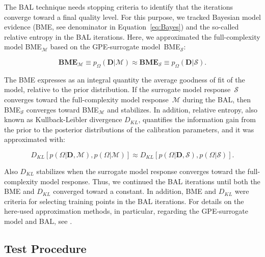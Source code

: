 \documentclass[draft,linenumbers,onecolumn]{agujournal2019} %
\begin{document}
The BAL technique needs stopping criteria to identify that the iterations converge toward a final quality level. For this purpose, we tracked Bayesian model evidence (BME, see denominator in Equation~\ref{eq:Bayes}) and the so-called relative entropy in the BAL iterations. Here, we approximated the full-complexity model BME$_{\mathcal{M}}$ based on the GPE-surrogate model~BME$_{\mathcal{S}}$:

\begin{equation}
	\textbf{BME}_{\mathcal{M}} \equiv p_{\Omega}(\textbf{D} \vert {\mathcal{M}}) \approx \textbf{BME}_{\mathcal{S}} \equiv p_{\Omega}(\textbf{D} \vert {\mathcal{S}}) .
	\label{eq:bal_bme}
\end{equation}

The BME expresses as an integral quantity the average goodness of fit of the model, relative to the prior distribution. If the surrogate model response~$\mathcal{S}$ converges toward the full-complexity model response~$\mathcal{M}$ during the BAL, then BME$_{\mathcal{S}}$ converges toward BME$_{\mathcal{M}}$ and stabilizes. In addition, relative entropy, also known as Kullback-Leibler divergence $D_{KL}$, quantifies the information gain from the prior to the posterior distributions of the calibration parameters, and it was approximated with:

\begin{equation}
	\label{eq:re}
	D_{KL} [p(\Omega \vert \textbf{D},\mathcal{M}), p(\Omega \vert \mathcal{M})] \approx D_{KL} [p(\Omega \vert \textbf{D},\mathcal{S}), p(\Omega \vert \mathcal{S})] .
\end{equation}

Also $D_{KL}$ stabilizes when the surrogate model response converges toward the full-complexity model response. Thus, we continued the BAL iterations until both the BME and $D_{KL}$ converged toward a constant. In addition, BME and $D_{KL}$ were criteria for selecting training points in the BAL iterations. For details on the here-used approximation methods, in particular, regarding the GPE-surrogate model and BAL, see .


\subsection{Test Procedure}
\label{sec:test-proc}
\end{document}

